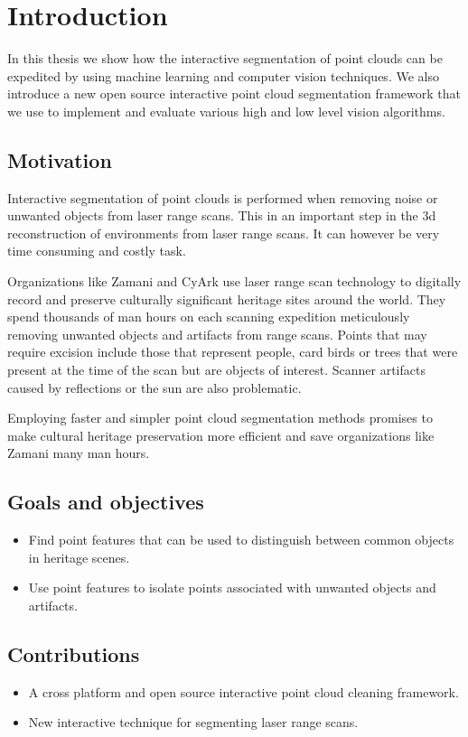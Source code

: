 \chapter{Introduction}

In this thesis we show how the interactive segmentation of point clouds can be expedited by using machine learning and computer vision techniques. We also introduce a new open source interactive point cloud segmentation framework that we use to implement and evaluate various high and low level vision algorithms.

\section{Motivation}
Interactive segmentation of point clouds is performed when removing noise or unwanted objects from laser range scans. This in an important step in the 3d reconstruction of environments from laser range scans. It can however be very time consuming and costly task.

Organizations like Zamani and CyArk use laser range scan technology to digitally record and preserve culturally significant heritage sites around the world. They spend thousands of man hours on each scanning expedition meticulously removing unwanted objects and artifacts from range scans. Points that may require excision include those that represent people, card birds or trees that were present at the time of the scan but are objects of interest. Scanner artifacts caused by reflections or the sun are also problematic.

Employing faster and simpler point cloud segmentation methods promises to make cultural heritage preservation more efficient and save organizations like Zamani many man hours.

\section{Goals and objectives}
\begin{itemize}
\item Find point features that can be used to distinguish between common objects in heritage scenes.
\item Use point features to isolate points associated with unwanted objects and artifacts.
\end{itemize}

\section{Contributions}
\begin{itemize}
\item A cross platform and open source interactive point cloud cleaning framework.
\item New interactive technique for segmenting laser range scans.
\end{itemize}

